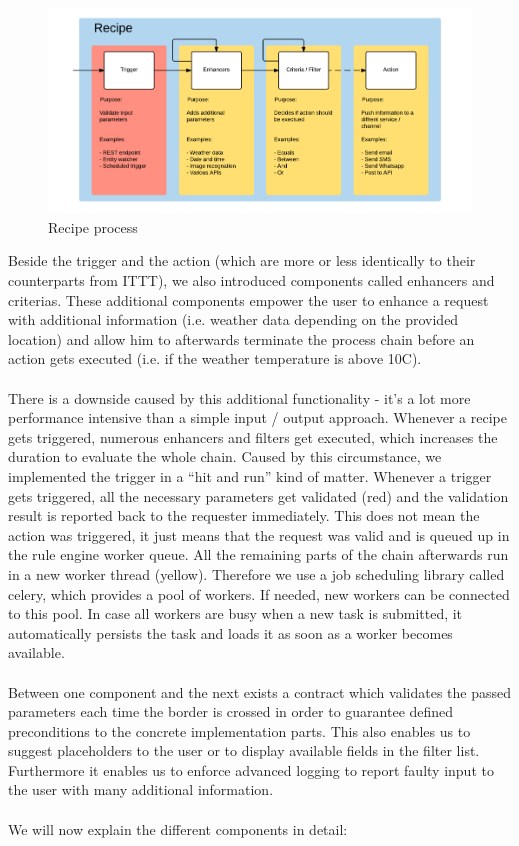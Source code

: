 \documentclass[11pt]{article} %
\begin{document}
\begin{figure}[H]
\begin{center}
\includegraphics[width=1.0\textwidth]{recipe_process}
\end{center}
\caption{Recipe process}
\label{fig:recipe_process}
\end{figure}

Beside the trigger and the action (which are more or less identically to their counterparts from ITTT), we also introduced components called enhancers and criterias. These additional components empower the user to enhance a request with additional information (i.e. weather data depending on the provided location) and allow him to afterwards terminate the process chain before an action gets executed (i.e. if the weather temperature is above 10C).\\
\\
There is a downside caused by this additional functionality - it’s a lot more performance intensive than a simple input / output approach. Whenever a recipe gets triggered, numerous enhancers and filters get executed, which increases the duration to evaluate the whole chain. Caused by this circumstance, we implemented the trigger in a “hit and run” kind of matter. Whenever a trigger gets triggered, all the necessary parameters get validated (red) and the validation result is reported back to the requester immediately. This does not mean the action was triggered, it just means that the request was valid and is queued up in the rule engine worker queue. All the remaining parts of the chain afterwards run in a new worker thread (yellow). Therefore we use a job scheduling library called celery\cite{celery}, which provides a pool of workers. If needed, new workers can be connected to this pool. In case all workers are busy when a new task is submitted, it automatically persists the task and loads it as soon as a worker becomes available.\\
\\
Between one component and the next exists a contract which validates the passed parameters each time the border is crossed in order to guarantee defined preconditions to the concrete implementation parts. This also enables us to suggest placeholders to the user or to display available fields in the filter list. Furthermore it enables us to enforce advanced logging to report faulty input to the user with many additional information.\\
\\
We will now explain the different components in detail:
\end{document}
